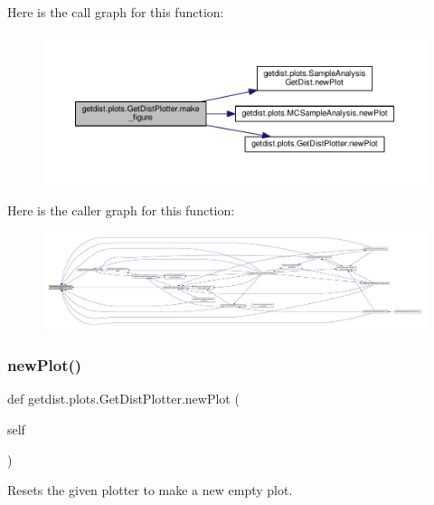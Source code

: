 Here is the call graph for this function\+:
\nopagebreak
\begin{figure}[H]
\begin{center}
\leavevmode
\includegraphics[width=350pt]{classgetdist_1_1plots_1_1GetDistPlotter_a07ead3d7a1afc0b7b944292e92342084_cgraph}
\end{center}
\end{figure}
Here is the caller graph for this function\+:
\nopagebreak
\begin{figure}[H]
\begin{center}
\leavevmode
\includegraphics[width=350pt]{classgetdist_1_1plots_1_1GetDistPlotter_a07ead3d7a1afc0b7b944292e92342084_icgraph}
\end{center}
\end{figure}
\mbox{\label{classgetdist_1_1plots_1_1GetDistPlotter_a844cb0d8b1f652daf9b23267a470636c}} 
\subsubsection{\texorpdfstring{new\+Plot()}{newPlot()}}
{\footnotesize\ttfamily def getdist.\+plots.\+Get\+Dist\+Plotter.\+new\+Plot (\begin{DoxyParamCaption}\item[{}]{self }\end{DoxyParamCaption})}

\begin{DoxyVerb}Resets the given plotter to make a new empty plot.
\end{DoxyVerb}
 

